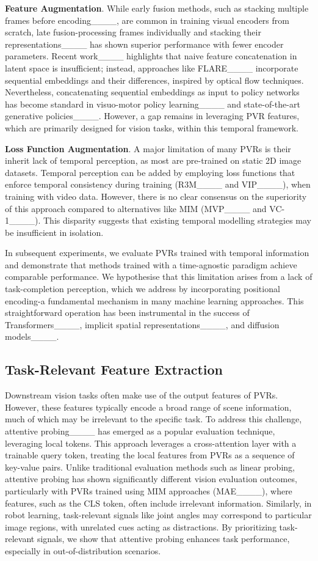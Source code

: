\textbf{Feature Augmentation}. While early fusion methods, such as stacking multiple frames before encoding____, are common in training visual encoders from scratch, late fusion-processing frames individually and stacking their representations____ has shown superior performance with fewer encoder parameters. 
Recent work____ highlights that naive feature concatenation in latent space is insufficient; instead, approaches like FLARE____ incorporate sequential embeddings and their differences, inspired by optical flow techniques. 
Nevertheless, concatenating sequential embeddings as input to policy networks has become standard in visuo-motor policy learning____ and state-of-the-art generative policies____. 
However, a gap remains in leveraging PVR features, which are primarily designed for vision tasks, within this temporal framework.

\textbf{Loss Function Augmentation}. A major limitation of many PVRs is their inherit lack of temporal perception, as most are pre-trained on static 2D image datasets. 
Temporal perception can be added by employing loss functions that enforce temporal consistency during training (\eg R3M____ and VIP____), when training with video data.  
However, there is no clear consensus on the superiority of this approach compared to alternatives like MIM (\eg MVP____ and VC-1____). 
This disparity suggests that existing temporal modelling strategies may be insufficient in isolation. 

In subsequent experiments, we evaluate PVRs trained with temporal information and demonstrate that methods trained with a time-agnostic paradigm achieve comparable performance.
We hypothesise that this limitation arises from a lack of task-completion perception, which we address by incorporating positional encoding-a fundamental mechanism in many machine learning approaches.
This straightforward operation has been instrumental in the success of Transformers____, implicit spatial representations____, and diffusion models____.

\subsection{Task-Relevant Feature Extraction}
Downstream vision tasks often make use of the output features of PVRs. 
However, these features typically encode a broad range of scene information, much of which may be irrelevant to the specific task. 
To address this challenge, attentive probing____ has emerged as a popular evaluation technique, leveraging local tokens. 
This approach leverages a cross-attention layer with a trainable query token, treating the local features from PVRs as a sequence of key-value pairs. 
Unlike traditional evaluation methods such as linear probing, attentive probing has shown significantly different vision evaluation outcomes, particularly with PVRs trained using MIM approaches (\eg MAE____), where features, such as the CLS token, often include irrelevant information.
Similarly, in robot learning, task-relevant signals like joint angles may correspond to particular image regions, with unrelated cues acting as distractions. 
By prioritizing task-relevant signals, we show that attentive probing enhances task performance, especially in out-of-distribution scenarios.